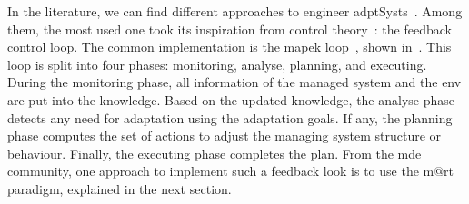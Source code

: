 In the literature, we can find different approaches to engineer \glspl{adptSyst}~\cite{DBLP:journals/computer/GarlanCHSS04}.
Among them, the most used one took its inspiration from control theory~\cite{DBLP:conf/dagstuhl/BrunSGGKLMPS09}: the feedback control loop.
The common implementation is the \gls{mapek} loop~\cite{DBLP:journals/computer/KephartC03, computing2006architectural}, shown in~.
This loop is split into four phases: monitoring, analyse, planning, and executing.
During the monitoring phase, all information of the managed system and the \gls{env} are put into the knowledge.
Based on the updated knowledge, the analyse phase detects any need for adaptation using the adaptation goals.
If any, the planning phase computes the set of actions to adjust the managing system structure or behaviour.
Finally, the executing phase completes the plan.
From the \gls{mde} community, one approach to implement such a feedback look is to use the \gls{m@rt} paradigm, explained in the next section. 




